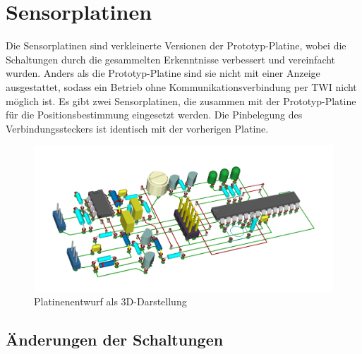 \section{Sensorplatinen}
Die Sensorplatinen sind verkleinerte Versionen der Prototyp-Platine, wobei die Schaltungen durch die gesammelten Erkenntnisse verbessert und vereinfacht wurden. Anders als die Prototyp-Platine sind sie nicht mit einer Anzeige ausgestattet, sodass ein Betrieb ohne Kommunikationsverbindung per \ac{TWI} nicht möglich ist. Es gibt zwei Sensorplatinen, die zusammen mit der Prototyp-Platine für die Positionsbestimmung eingesetzt werden. Die Pinbelegung des Verbindungssteckers ist identisch mit der vorherigen Platine.

\begin{figure}[H]
	\centering
	\includegraphics[width=(\textwidth)]{images/endplatine_3d.png}
	\caption{Platinenentwurf als 3D-Darstellung} \label{img:endplatine3d}
\end{figure}


\subsection{Änderungen der Schaltungen}


